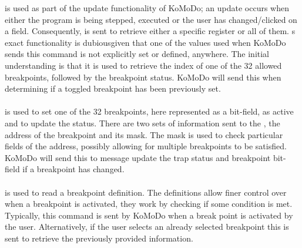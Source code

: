 %
 is used as part of the update functionality of KoMoDo; an update occurs when either the program is being stepped, executed or the user has changed/clicked on a field. Consequently,  is sent to retrieve either a specific register or all of them.
%
%
%
%
s exact functionality is dubiousgiven that one of the values used when KoMoDo sends this command is not explicitly set or defined, anywhere. The initial understanding is that it is used to retrieve the index of one of the 32 allowed breakpoints, followed by the breakpoint status. KoMoDo will send this when determining if a toggled breakpoint has been previously set.\\\\
%
 is used to set one of the 32 breakpoints, here represented as a bit-field, as active and to update the status. There are two sets of information sent to the , the address of the breakpoint and its mask. The mask is used to check particular fields of the address, possibly allowing for multiple breakpoints to be satisfied. KoMoDo will send this to message update the trap status and breakpoint bit-field if a breakpoint has changed.\\\\
%
 is used to read a breakpoint definition. The definitions allow finer control over when a breakpoint is activated, they work by checking if some condition is met. Typically, this command is sent by KoMoDo when a break point is activated by the user. Alternatively, if the user selects an already selected breakpoint this is sent to retrieve the previously provided information.\\\\
